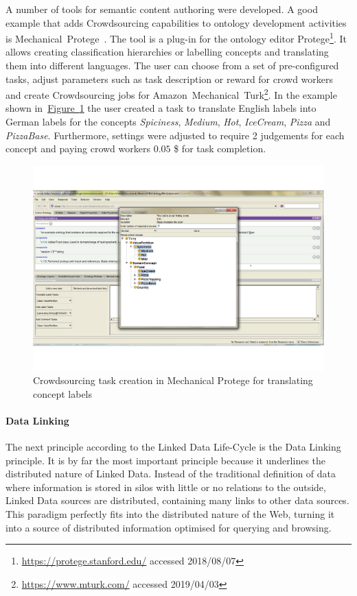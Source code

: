 A number of tools for semantic content authoring were developed. A good example that adds Crowdsourcing capabilities to ontology development activities is Mechanical~Protege~\cite{simperlMechnicalProtege}. The tool is a plug-in for the ontology editor Protege\footnote{\url{https://protege.stanford.edu/} accessed 2018/08/07}. It allows creating classification hierarchies or labelling concepts and translating them into different languages. The user can choose from a set of pre-configured tasks, adjust parameters such as task description or reward for crowd workers and create Crowdsourcing jobs for Amazon~Mechanical~Turk\footnote{\url{https://www.mturk.com/} accessed 2019/04/03}. In the example shown in~\hyperref[fig:mechanical_protege_example]{Figure~\ref*{fig:mechanical_protege_example}} the user created a task to translate English labels into German labels for the concepts \emph{Spiciness}, \emph{Medium}, \emph{Hot}, \emph{IceCream}, \emph{Pizza} and \emph{PizzaBase}. Furthermore, settings were adjusted to require 2 judgements for each concept and paying crowd workers $0.05$ \$ for task completion.  
\begin{figure}
	 \centering
	 \includegraphics[width=1\textwidth]{graphics/mechanical_protege_example}
	 \caption{Crowdsourcing task creation in Mechanical Protege for translating concept labels}
	 \label{fig:mechanical_protege_example}
\end{figure}

\paragraph{Data Linking}
The next principle according to the Linked Data Life-Cycle is the Data Linking principle. It is by far the most important principle because it 
underlines the distributed nature of Linked Data. Instead of the traditional definition of data where information is stored in silos with little or no relations to the outside, Linked Data sources are distributed, containing many links to other data sources. This paradigm perfectly fits into the distributed nature of the Web, turning it into a source of distributed information optimised for querying and browsing. 

